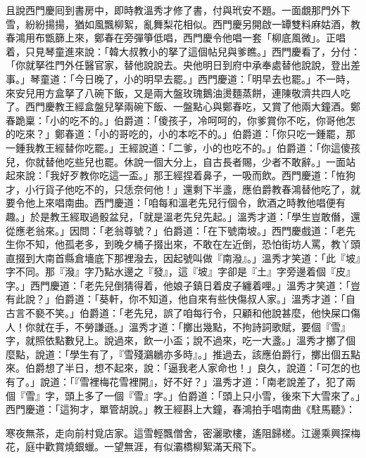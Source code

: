 且說西門慶囘到書房中，即時教溫秀才修了書，付與玳安不題。一面覷那門外下雪，紛紛揚揚，猶如風飄柳絮，亂舞梨花相似。西門慶另開啟一罈雙料麻姑酒，教春鴻用布甑篩上來，鄭春在旁彈箏低唱，西門慶令他唱一套「柳底風微」。正唱着，只見琴童進來說：「韓大叔教小的拏了這個帖兒與爹瞧。」西門慶看了，分付：「你就拏徃門外任醫官家，替他說說去。央他明日到府中承奉處替他說說，登出差事。」琴童道：「今日晚了，小的明早去罷。」西門慶道：「明早去也罷。」不一時，來安兒用方盒拏了八碗下飯，又是兩大盤玫瑰鵝油燙麵蒸餅，連陳敬濟共四人吃了。西門慶教王經盒盤兒拏兩碗下飯、一盤點心與鄭春吃，又賞了他兩大鐘酒。鄭春跪稟：「小的吃不的。」伯爵道：「傻孩子，冷呵呵的，你爹賞你不吃，你哥他怎的吃來？」鄭春道：「小的哥吃的，小的本吃不的。」伯爵道：「你只吃一鍾罷，那一鍾我教王經替你吃罷。」王經說道：「二爹，小的也吃不的。」伯爵道：「你這傻孩兒，你就替他吃些兒也罷。休說一個大分上，自古長者賜，少者不敢辭。」一面站起來說：「我好歹教你吃這一盃。」那王經捏着鼻子，一吸而飲。西門慶道：「恠狗才，小行貨子他吃不的，只恁奈何他！」還剩下半盞，應伯爵教春鴻替他吃了，就要令他上來唱南曲。西門慶道：「咱每和溫老先兒行個令，飲酒之時教他唱便有趣。」{}於是教王經取過骰盆兒，「就是溫老先兒先起。」溫秀才道：「學生豈敢僭，還從應老翁來。」因問：「老翁尊號？」伯爵道：「在下號南坡。」西門慶戲道：「老先生你不知，他孤老多，到晚夕桶子掇出來，不敢在左近倒，恐怕街坊人罵，教丫頭直掇到大南首縣倉墻底下那裡潑去，因起號叫做『南潑』。」溫秀才笑道：「此『坡』字不同。那『潑』字乃點水邊之『發』，這『坡』字卻是『土』字旁邊着個『皮』字。」{}西門慶道：「老先兒倒猜得着，他娘子鎮日着皮子纏着哩。」{}溫秀才笑道：「豈有此說？」伯爵道：「葵軒，你不知道，他自來有些快傷叔人家。」溫秀才道：「自古言不褻不笑。」伯爵道：「老先兒，誤了咱每行令，只顧和他說甚麼，他快屎口傷人！你就在手，不勞謙遜。」溫秀才道：「擲出幾點，不拘詩詞歌賦，要個『雪』字，就照依點數兒上。說過來，飲一小盃；說不過來，吃一大盞。」溫秀才擲了個麼點，說道：「學生有了，『雪殘鸂鶒亦多時』。」推過去，該應伯爵行，擲出個五點來。伯爵想了半日，想不起來，說：「逼我老人家命也！」良久，說道：「可怎的也有了。」說道：「『雪裡梅花雪裡開』，好不好？」溫秀才道：「南老說差了，犯了兩個『雪』字，頭上多了一個『雪』字。」伯爵道：「頭上只小雪，後來下大雪來了。」西門慶道：「這狗才，單管胡說。」教王經斟上大鐘，春鴻拍手唱南曲《駐馬聽》：

\begin{myquote}
寒夜無茶，走向前村覓店家。這雪輕飄僧舍，密灑歌樓，遙阻歸槎。江邊乘興探梅花，庭中歡賞燒銀蠟。一望無涯，有似灞橋柳絮滿天飛下。
\end{myquote}

